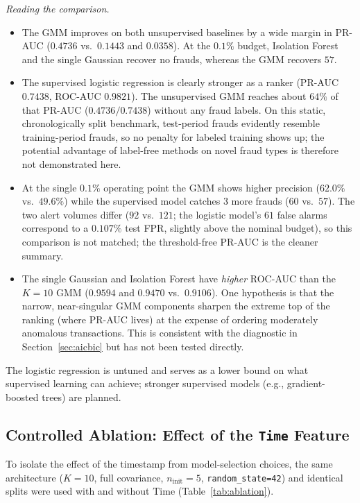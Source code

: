 \documentclass[conference]{IEEEtran}
\begin{document}
\textit{Reading the comparison.}
\begin{itemize}
    \item The GMM improves on both unsupervised baselines by a wide margin in PR-AUC ($0.4736$ vs.\ $0.1443$ and $0.0358$). At the $0.1\%$ budget, Isolation Forest and the single Gaussian recover no frauds, whereas the GMM recovers $57$.
    \item The supervised logistic regression is clearly stronger as a ranker (PR-AUC $0.7438$, ROC-AUC $0.9821$). The unsupervised GMM reaches about $64\%$ of that PR-AUC ($0.4736/0.7438$) without any fraud labels. On this static, chronologically split benchmark, test-period frauds evidently resemble training-period frauds, so no penalty for labeled training shows up; the potential advantage of label-free methods on novel fraud types is therefore not demonstrated here.
    \item At the single $0.1\%$ operating point the GMM shows higher precision ($62.0\%$ vs.\ $49.6\%$) while the supervised model catches $3$ more frauds ($60$ vs.\ $57$). The two alert volumes differ ($92$ vs.\ $121$; the logistic model's $61$ false alarms correspond to a $0.107\%$ test FPR, slightly above the nominal budget), so this comparison is not matched; the threshold-free PR-AUC is the cleaner summary.
    \item The single Gaussian and Isolation Forest have \emph{higher} ROC-AUC than the $K=10$ GMM ($0.9594$ and $0.9470$ vs.\ $0.9106$). One hypothesis is that the narrow, near-singular GMM components sharpen the extreme top of the ranking (where PR-AUC lives) at the expense of ordering moderately anomalous transactions. This is consistent with the diagnostic in Section~\ref{sec:aicbic} but has not been tested directly.
\end{itemize}
The logistic regression is untuned and serves as a lower bound on what supervised learning can achieve; stronger supervised models (e.g., gradient-boosted trees) are planned.

\subsection{Controlled Ablation: Effect of the \texorpdfstring{\texttt{Time}}{Time} Feature}
\label{sec:ablation}
To isolate the effect of the timestamp from model-selection choices, the same architecture ($K=10$, full covariance, $n_{\text{init}}=5$, \texttt{random\_state=42}) and identical splits were used with and without $\text{Time}$ (Table~\ref{tab:ablation}).
\end{document}
